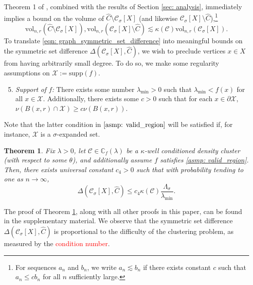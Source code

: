 \documentclass{article}
\newcommand{\vol}{\mathrm{vol}}
\newcommand{\1}{\mathbf{1}}
\newcommand{\Xbf}{X}             %
\newcommand{\Cbb}{\mathbb{C}}
\newcommand{\Cset}{\mathcal{C}}
\newcommand{\Csig}{\Cset_{\sigma}}
\newcommand{\Cest}{\widehat{C}}
\theoremstyle{aldenthm}
\newtheorem{theorem}{Theorem}
\theoremstyle{aldenrmrk}
\begin{document}
Theorem 1 of \cite{zhu2013}, combined with the results of Section \ref{sec: analysis}, immediately implies a bound on the volume of $\Cest \setminus \Csig[\Xbf]$ (and likewise $\Csig[\Xbf] \setminus \Cest$),\footnote{For sequences $a_n$ and $b_n$, we write $a_n \lesssim b_n$ if there exists constant $c$ such that $a_n \leq c b_n$ for all $n$ sufficiently large. }
\begin{equation}
\label{eqn: graph_symmetric_set_difference}
\vol_{n,r}(\Cest \setminus \Csig[\Xbf]), \vol_{n,r}(\Csig[\Xbf] \setminus \Cest) \lesssim \kappa(\Cset) \vol_{n,r}(\Csig[\Xbf]).
\end{equation}
To translate \eqref{eqn: graph_symmetric_set_difference} into meaningful bounds on the symmetric set difference $\Delta(\Csig[\Xbf], \Cest)$, we wish to preclude vertices $x \in \Xbf$ from having arbitrarily small degree. To do so, we make some regularity assumptions on $\mathcal{X} := \mathrm{supp}(f)$.
\begin{enumerate}[label=(A\arabic*)]
	\setcounter{enumi}{4}
	\item 
	\label{asmp: valid_region}
	\emph{Support of $f$:} There exists some number $\lambda_{\min} > 0$ such that $\lambda_{\min} < f(x)$ for all $x \in \mathcal{X}$. Additionally, there exists some $c > 0$ such that for each $x \in \partial \mathcal{X}$, $\nu(B(x,r) \cap \mathcal{X}) \geq c\nu(B(x,r))$.
\end{enumerate}
Note that the latter condition in $\ref{asmp: valid_region}$ will be satisfied if, for instance, $\mathcal{X}$ is a $\sigma$-expanded set.

\begin{theorem}
	\label{thm: misclassification_rate}
	Fix $\lambda > 0$, let $\Cset \in \Cbb_f(\lambda)$ be a $\kappa$-well conditioned density cluster (with respect to some $\theta$), and additionally assume $f$ satisfies \ref{asmp: valid_region}. Then, there exists universal constant $c_4 > 0$ such that with probability tending to one as $n \to \infty$, 
	\begin{equation}
	\label{eqn: misclassification_rate_ub}
	\Delta(\Csig[\Xbf], \Cest) \leq c_4 \kappa(\Cset) \frac{\Lambda_{\sigma}}{\lambda_{\min}}.
	\end{equation}
\end{theorem}

The proof of Theorem \ref{thm: misclassification_rate}, along with all other proofs in this paper, can be found in the supplementary material. We observe that the symmetric set difference $\Delta(\Csig[\Xbf], \Cest)$  is proportional to the difficulty of the clustering problem, as measured by the \textcolor{red}{condition number}.
\end{document}
